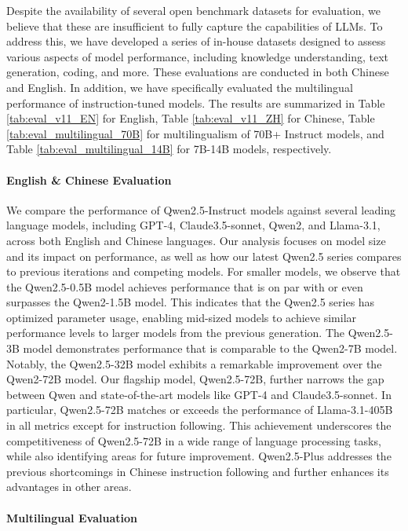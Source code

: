 \documentclass{article}
\begin{document}
Despite the availability of several open benchmark datasets for evaluation, we believe that these are insufficient to fully capture the capabilities of LLMs.
To address this, we have developed a series of in-house datasets designed to assess various aspects of model performance, including knowledge understanding, text generation, coding, and more. 
These evaluations are conducted in both Chinese and English.
In addition, we have specifically evaluated the multilingual performance of instruction-tuned models. 
The results are summarized in Table \ref{tab:eval_v11_EN} for English, Table \ref{tab:eval_v11_ZH} for Chinese, Table \ref{tab:eval_multilingual_70B} for multilingualism of 70B+ Instruct models, and Table \ref{tab:eval_multilingual_14B} for 7B-14B models, respectively.

\paragraph{English \& Chinese Evaluation}

We compare the performance of Qwen2.5-Instruct models against several leading language models, including GPT-4, Claude3.5-sonnet, Qwen2, and Llama-3.1, across both English and Chinese languages. Our analysis focuses on model size and its impact on performance, as well as how our latest Qwen2.5 series compares to previous iterations and competing models.
For smaller models, we observe that the Qwen2.5-0.5B model achieves performance that is on par with or even surpasses the Qwen2-1.5B model. 
This indicates that the Qwen2.5 series has optimized parameter usage, enabling mid-sized models to achieve similar performance levels to larger models from the previous generation.
The Qwen2.5-3B model demonstrates performance that is comparable to the Qwen2-7B model. 
Notably, the Qwen2.5-32B model exhibits a remarkable improvement over the Qwen2-72B model.
Our flagship model, Qwen2.5-72B, further narrows the gap between Qwen and state-of-the-art models like GPT-4 and Claude3.5-sonnet. In particular, Qwen2.5-72B matches or exceeds the performance of Llama-3.1-405B in all metrics except for instruction following. This achievement underscores the competitiveness of Qwen2.5-72B in a wide range of language processing tasks, while also identifying areas for future improvement.
Qwen2.5-Plus addresses the previous shortcomings in Chinese instruction following and further enhances its advantages in other areas.

\paragraph{Multilingual Evaluation}
\end{document}
